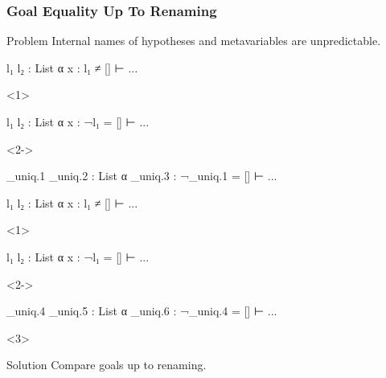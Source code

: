 \begin{frame}[fragile]
  \frametitle{Goal Equality Up To Renaming}

  \begin{block}{Problem}
    Internal names of hypotheses and metavariables are unpredictable.

    \begin{minipage}{.3\textwidth}
      \begin{leancode}
        l₁ l₂ : List α
        x : l₁ ≠ []
        ⊢ ...
      \end{leancode}
    \end{minipage}
    \Longrightarrow %
    \begin{minipage}{.5\textwidth}
      \begin{onlyenv}<1>
        \begin{leancode}
          l₁ l₂ : List α
          x : ¬l₁ = []
          ⊢ ...
        \end{leancode}
      \end{onlyenv}
      \begin{onlyenv}<2->
        \begin{leancode}
          _uniq.1 _uniq.2 : List α
          _uniq.3 : ¬_uniq.1 = []
          ⊢ ...
        \end{leancode}
      \end{onlyenv}
    \end{minipage}

    \begin{minipage}{.3\textwidth}
      \begin{leancode}
        l₁ l₂ : List α
        x : l₁ ≠ []
        ⊢ ...
      \end{leancode}
    \end{minipage}
    \Longrightarrow %
    \begin{minipage}{.5\textwidth}
      \begin{onlyenv}<1>
        \begin{leancode}
          l₁ l₂ : List α
          x : ¬l₁ = []
          ⊢ ...
        \end{leancode}
      \end{onlyenv}
      \begin{onlyenv}<2->
        \begin{leancode}
          _uniq.4 _uniq.5 : List α
          _uniq.6 : ¬_uniq.4 = []
          ⊢ ...
        \end{leancode}
      \end{onlyenv}
    \end{minipage}
  \end{block}

  \begin{onlyenv}<3>
    \begin{block}{Solution}
      Compare goals up to renaming.
    \end{block}
  \end{onlyenv}
\end{frame}

